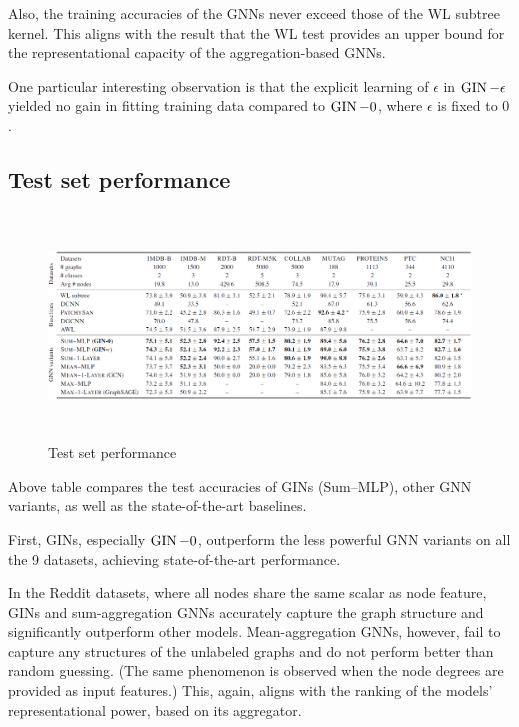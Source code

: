 Also, the training accuracies of the GNNs never exceed those of the WL subtree kernel. This aligns with the result that the WL test provides an upper bound for the representational capacity of the aggregation-based GNNs.

One particular interesting observation is that the explicit learning of $\epsilon$ in $\operatorname{GIN}-\epsilon$ yielded no gain in fitting training data compared to $\operatorname{GIN}-0$, where $\epsilon$ is fixed to $0$.



\subsection{Test set performance}

\begin{figure}[!hbt]
  \includegraphics[height=6cm]{experiments/fig/fig6.png}
  \caption{Test set performance}
\end{figure}

Above table compares the test accuracies of GINs (Sum–MLP), other GNN variants, as well as the state-of-the-art baselines.

First, GINs, especially $\operatorname{GIN}-0$, outperform the less powerful GNN variants on all the 9 datasets, achieving state-of-the-art performance.

In the Reddit datasets, where all nodes share the same scalar as node feature, GINs and sum-aggregation GNNs accurately capture the graph structure and significantly outperform other models.
Mean-aggregation GNNs, however, fail to capture any structures of the unlabeled graphs and do not perform better than random guessing.
(The same phenomenon is observed when the node degrees are provided as input features.)
This, again, aligns with the ranking of the models’ representational power, based on its aggregator.

